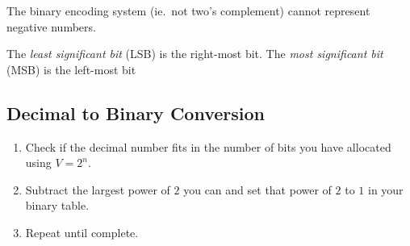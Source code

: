 \begin{note}
	The binary encoding system (ie.\ not two's complement) cannot represent negative numbers.
\end{note}

The \emph{least significant bit} (LSB) is the right-most bit.
The \emph{most significant bit} (MSB) is the left-most bit

\subsection{Decimal to Binary Conversion}\label{sub:decimal_to_binary_conversion}

\begin{enumerate}
	\item Check if the decimal number fits in the number of bits you have allocated using \(V=2^n\).
	\item Subtract the largest power of \(2\) you can and set that power of \(2\) to \(1\) in your binary table.
	\item Repeat until complete.
\end{enumerate}

